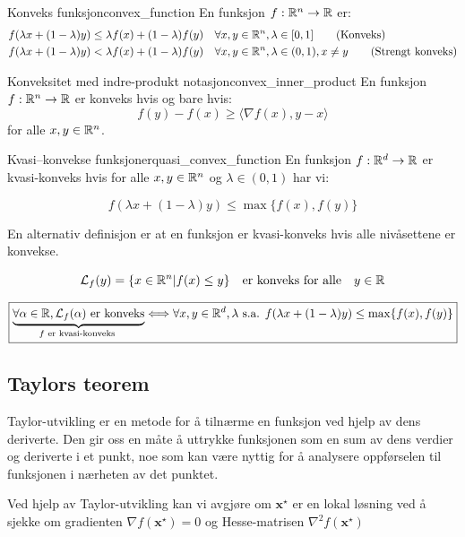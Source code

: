\begin{definition}{Konveks funksjon}{convex_function}
	En funksjon \(f: \mathbb{R}^n \to \mathbb{R}\) er:
	\begin{align*}
		f(\lambda x + (1-\lambda)y) & \leq \lambda f(x) + (1-\lambda)f(y) \quad \forall x, y \in \mathbb{R}^n, \lambda \in [0, 1] \tag{Konveks}                  \\
		f(\lambda x + (1-\lambda)y) & < \lambda f(x) + (1 - \lambda)f(y) \quad \forall x, y \in \mathbb{R}^n, \lambda \in (0, 1), x \neq y \tag{Strengt konveks}
	\end{align*}
\end{definition}

\begin{remark}{Konveksitet med indre-produkt notasjon}{convex_inner_product}
	En funksjon  \(f: \mathbb{R}^n \to \mathbb{R}\) er konveks hvis og bare hvis:
	\[
		f(y) - f(x) \geq  \langle \nabla f(x), y - x \rangle
	\]
	for alle  \(x, y \in \mathbb{R}^n\).
\end{remark}

\begin{remark}{Kvasi--konvekse funksjoner}{quasi_convex_function}
	En funksjon \(f: \mathbb{R}^d \to \mathbb{R}\) er kvasi-konveks hvis for alle \(x, y \in \mathbb{R}^n\) og \(\lambda \in (0, 1)\) har vi:

	\[
		f(\lambda x + (1 - \lambda)y) \leq \max\{f(x), f(y)\}
	\]

	En alternativ definisjon er at en funksjon er kvasi-konveks hvis alle nivåsettene er konvekse.

	\[
		\mathcal{L}_f(y) = \{x \in \mathbb{R}^n | f(x) \leq y\} \quad \text{er konveks for alle} \quad y \in \mathbb{R}
	\]

	\[
		\boxed{\underbrace{\forall \alpha \in \mathbb{R}, \mathcal{L}_f(\alpha) \text{ er konveks}}_{f \text{ er kvasi-konveks }}\Longleftrightarrow \forall x, y \in \mathbb{R}^d,\lambda \text{ s.a. } f(\lambda x + (1-\lambda)y) \leq \max \{ f(x), f(y) \}}
	\]
\end{remark}

\subsection{Taylors teorem}
Taylor-utvikling er en metode for å tilnærme en funksjon ved hjelp av dens deriverte.
Den gir oss en måte å uttrykke funksjonen som en sum av dens verdier og deriverte i et punkt, noe som kan være nyttig for å analysere oppførselen til funksjonen i nærheten av det punktet.

Ved hjelp av Taylor-utvikling kan vi avgjøre om \(\symbf{x}^\star\) er en lokal løsning ved å sjekke om gradienten \(\nabla f(\symbf{x}^\star) = 0\) og Hesse-matrisen \(\nabla^2 f(\symbf{x}^\star)\)

